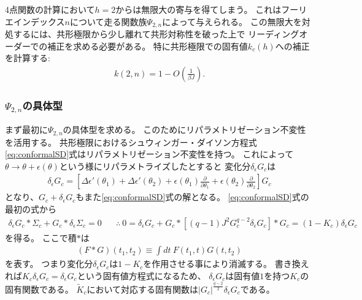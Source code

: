 4点関数の計算において$h = 2$からは無限大の寄与を得てしまう。
これはフーリエインデックス$n$について走る関数族$\Psi_{2,n}$によって与えられる。
この無限大を対処するには、共形極限から少し離れて共形対称性を破った上で
リーディングオーダーでの補正を求める必要がある。
特に共形極限での固有値$k_c(h)$への補正を計算する:
\begin{align}
	k(2, n) = 1 - O\left(\frac{1}{\beta J}\right).
\end{align}

\subsubsection{$\Psi_{2,n}$の具体型}
まず最初に$\Psi_{2,n}$の具体型を求める。
このためにリパラメトリゼーション不変性を活用する。
共形極限におけるシュウィンガー・ダイソン方程式\eqref{eq:conformalSD}式はリパラメトリゼーション不変性を持つ。
これによって$\theta\to\theta + \epsilon(\theta)$という様にリパラメトライズしたとすると
変化分$\delta_{\epsilon}G_c$は
\begin{align}
	\delta_{\epsilon}G_c
	= \left[\Delta\epsilon'(\theta_1) + \Delta\epsilon'(\theta_2)
		+ \epsilon(\theta_1)\frac{\partial}{\partial{\theta_1}}
		+ \epsilon(\theta_2)\frac{\partial}{\partial{\theta_2}}
	\right]G_c
	\label{eq:reparameterization_fomula}
\end{align}
となり、$G_c + \delta_{\epsilon}G_c$もまた\eqref{eq:conformalSD}式の解となる。
\eqref{eq:conformalSD}式の最初の式から
\begin{align}
	\delta_{\epsilon}G_c * \Sigma_c + G_c * \delta_{\epsilon}\Sigma_c = 0\hspace{20pt}
	\therefore\ 
	0 = \delta_{\epsilon}G_c + G_c * [(q-1)J^2G_c^{q-2}\delta_{\epsilon}G_c] * G_c
	= (1 - K_c)\delta_{\epsilon}G_c
	\label{eq:eigenfunc_of_Kc_is_reparametrization}
\end{align}
を得る。
ここで積$*$は
\begin{align}
	(F*G)(t_1, t_2) \equiv \int dt\ F(t_1, t)G(t, t_2)
\end{align}
を表す。
つまり変化分$\delta_{\epsilon}G_c$は$1 - K_c$を作用させる事により消滅する。
書き換えれば$K_c\delta_{\epsilon}G_c = \delta_{\epsilon}G_c$という固有値方程式になるため、
$\delta_{\epsilon}G_c$は固有値$1$を持つ$K_c$の固有関数である。
$\tilde{K}_c$において対応する固有関数は$|G_c|^{\frac{q-2}{2}}\delta_{\epsilon}G_c$である。

